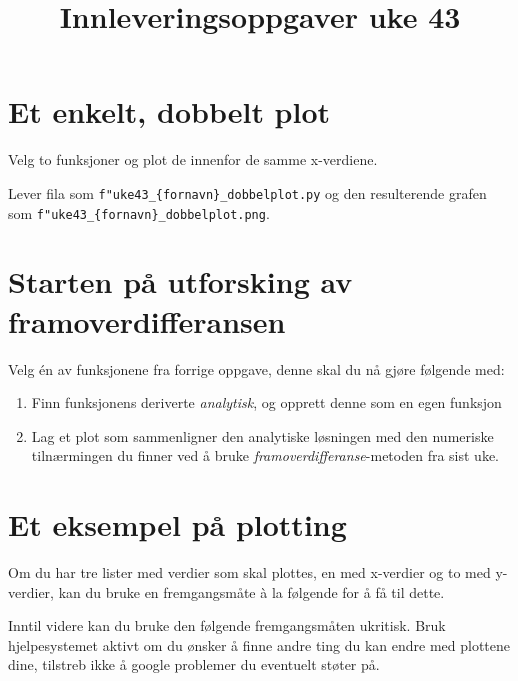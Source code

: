 \documentclass[11pt]{article}
\date{}
\title{Innleveringsoppgaver uke 43}
\theoremstyle{definition}
\begin{document}
\maketitle
\section*{Et enkelt, dobbelt plot}
\label{sec:orgbd96d91}

Velg to funksjoner og plot de innenfor de samme x-verdiene.

Lever fila som \texttt{f"uke43\_\{fornavn\}\_dobbelplot.py} og den resulterende grafen som \texttt{f"uke43\_\{fornavn\}\_dobbelplot.png}.

\section*{Starten på utforsking av framoverdifferansen}
\label{sec:org36251a4}
Velg én av funksjonene fra forrige oppgave, denne skal du nå gjøre følgende med:

\begin{enumerate}
\item Finn funksjonens deriverte \emph{analytisk}, og opprett denne som en egen funksjon
\item Lag et plot som sammenligner den analytiske løsningen med den numeriske tilnærmingen du finner ved å bruke \emph{framoverdifferanse}-metoden fra sist uke.
\end{enumerate}

\section*{Et eksempel på plotting}
\label{sec:orga002abc}
Om du har tre lister med verdier som skal plottes, en med x-verdier og to med y-verdier, kan du bruke en fremgangsmåte à la følgende for å få til dette.

Inntil videre kan du bruke den følgende fremgangsmåten ukritisk. Bruk hjelpesystemet aktivt om du ønsker å finne andre ting du kan endre med plottene dine, tilstreb ikke å google problemer du eventuelt støter på.
\end{document}
